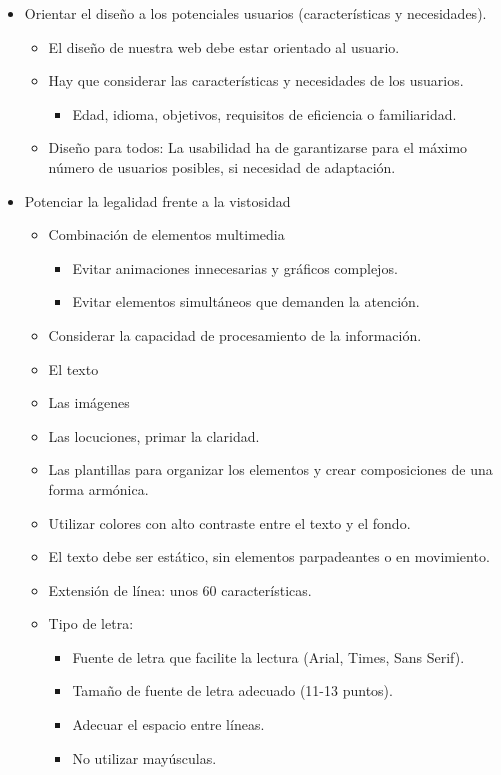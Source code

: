 \documentclass[12pt, twoside, openright]{report} %
\begin{document}
    \begin{itemize}
    
    \item
      Orientar el diseño a los potenciales usuarios (características y
      necesidades).

      \begin{itemize}
      \item
        El diseño de nuestra web debe estar orientado al usuario.
      \item
        Hay que considerar las características y necesidades de los
        usuarios.

        \begin{itemize}
        
        \item
          Edad, idioma, objetivos, requisitos de eficiencia o
          familiaridad.
        \end{itemize}
        \item Diseño para todos: La usabilidad ha de garantizarse para el máximo
  número de usuarios posibles, si necesidad de adaptación.
      \end{itemize}

    
      

\item Potenciar la legalidad frente a la vistosidad
\begin{itemize}
  \item Combinación de elementos multimedia
  \begin{itemize}
    \item Evitar animaciones innecesarias y gráficos complejos.
    \item Evitar elementos simultáneos que demanden la atención.
  \end{itemize}
   
    \item Considerar la capacidad de procesamiento de la información.
\item El texto
\item Las imágenes
\item Las locuciones, primar la claridad.
\item Las plantillas para organizar los elementos y crear composiciones de una forma armónica.
\item Utilizar colores con alto contraste entre el texto y el fondo.
\item El texto debe ser estático, sin elementos parpadeantes o en movimiento.
\item Extensión de línea: unos 60 características.
\item Tipo de letra:
\begin{itemize}
  \item Fuente de letra que facilite la lectura (Arial, Times, Sans Serif).
  \item Tamaño de fuente de letra adecuado (11-13 puntos).
  \item Adecuar el espacio entre líneas.
  \item No utilizar mayúsculas.
\end{itemize}
    

\end{itemize}
\end{itemize}
\end{document}
